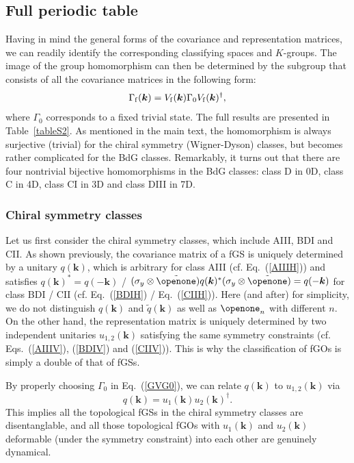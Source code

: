 \documentclass[prl,twocolumn,preprintnumbers,superscriptaddress,amsmath,amssymb]{revtex4-1}
\begin{document}
\subsection{Full periodic table}
Having in mind the general forms of the covariance and representation matrices, we can readily identify the corresponding classifying spaces and $K$-groups. The image of the group homomorphism can then be determined by the subgroup that consists of all the covariance matrices in the following form:
\begin{equation}
\Gamma_{\rm f}(\boldsymbol{k}) = V_{\rm f}(\boldsymbol{k}) \Gamma_0 V_{\rm f}(\boldsymbol{k})^\dag,
\label{GVG0}
\end{equation}
where $\Gamma_0$ corresponds to a fixed trivial state. The full results are presented in Table~\ref{tableS2}. As mentioned in the main text, the homomorphism is always surjective (trivial) for the chiral symmetry (Wigner-Dyson) classes, but becomes rather complicated for the BdG classes. Remarkably, it turns out that there are four nontrivial bijective homomorphisms in the BdG classes: class D in 0D, class C in 4D, class CI in 3D and class DIII in 7D.


\subsubsection{Chiral symmetry classes}
Let us first consider the chiral symmetry classes, which include AIII, BDI and CII. As shown previously, the covariance matrix of a fGS is uniquely determined by a unitary $q(\boldsymbol{k})$, which is arbitrary for class AIII (cf. Eq.~(\ref{AIIIH})) and satisfies $q(\boldsymbol{k})^* = q(-\boldsymbol{k})$ / $(\sigma_y\otimes\tilde\openone) q(\boldsymbol{k})^*(\sigma_y\otimes\tilde\openone) = q(-\boldsymbol{k})$ for class BDI / CII (cf. Eq.~(\ref{BDIH}) / Eq.~(\ref{CIIH})). Here (and after) for simplicity, we do not distinguish $q(\boldsymbol{k})$ and $\tilde q(\boldsymbol{k})$ as well as $\openone_n$ with different $n$. On the other hand, the representation matrix is uniquely determined by two independent unitaries $u_{1,2}(\boldsymbol{k})$ satisfying the same symmetry constraints (cf. Eqs.~(\ref{AIIIV}), (\ref{BDIV}) and (\ref{CIIV})). This is why the classification of fGOs is simply a double of that of fGSs. 

By properly choosing $\Gamma_0$ in Eq.~(\ref{GVG0}), we can relate $q(\boldsymbol{k})$ to $u_{1,2}(\boldsymbol{k})$ via 
\begin{equation}
q(\boldsymbol{k}) = u_1(\boldsymbol{k})u_2(\boldsymbol{k})^\dag.
\end{equation}
This implies all the topological fGSs in the chiral symmetry classes are disentanglable, and all those topological fGOs with $u_1(\boldsymbol{k})$ and $u_2(\boldsymbol{k})$ deformable (under the symmetry constraint) into each other are genuinely dynamical.
\end{document}
